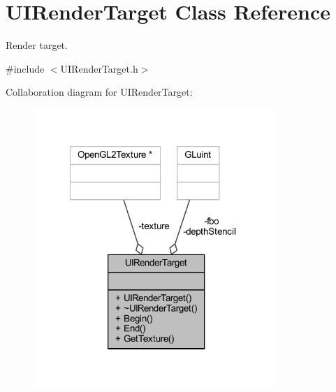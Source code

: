 \hypertarget{class_u_i_render_target}{\section{U\-I\-Render\-Target Class Reference}
\label{class_u_i_render_target}
}


Render target.  




{\ttfamily \#include $<$U\-I\-Render\-Target.\-h$>$}



Collaboration diagram for U\-I\-Render\-Target\-:\nopagebreak
\begin{figure}[H]
\begin{center}
\leavevmode
\includegraphics[width=259pt]{class_u_i_render_target__coll__graph}
\end{center}
\end{figure}
